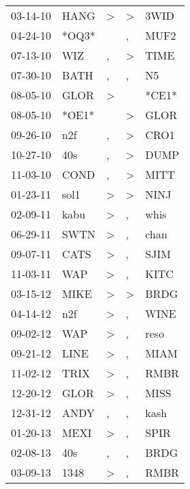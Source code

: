 \begin{supertabular}{lllll}
 03-14-10 &   HANG &     \textgreater &     \textgreater &   3WID \\
 04-24-10 &  *OQ3* &                  &                , &   MUF2 \\
 07-13-10 &    WIZ &                , &     \textgreater &   TIME \\
 07-30-10 &   BATH &                , &                , &     N5 \\
 08-05-10 &   GLOR &     \textgreater &                  &  *CE1* \\
 08-05-10 &  *OE1* &                  &     \textgreater &   GLOR \\
 09-26-10 &    n2f &                , &     \textgreater &   CRO1 \\
 10-27-10 &    40s &                , &     \textgreater &   DUMP \\
 11-03-10 &   COND &                , &     \textgreater &   MITT \\
 01-23-11 &   sol1 &     \textgreater &     \textgreater &   NINJ \\
 02-09-11 &   kabu &     \textgreater &                , &   whis \\
 06-29-11 &   SWTN &     \textgreater &                , &   chan \\
 09-07-11 &   CATS &     \textgreater &                , &   SJIM \\
 11-03-11 &    WAP &     \textgreater &                , &   KITC \\
 03-15-12 &   MIKE &     \textgreater &     \textgreater &   BRDG \\
 04-14-12 &    n2f &     \textgreater &                , &   WINE \\
 09-02-12 &    WAP &     \textgreater &                , &   reso \\
 09-21-12 &   LINE &     \textgreater &                , &   MIAM \\
 11-02-12 &   TRIX &     \textgreater &                , &   RMBR \\
 12-20-12 &   GLOR &     \textgreater &                , &   MISS \\
 12-31-12 &   ANDY &                , &                , &   kash \\
 01-20-13 &   MEXI &     \textgreater &                , &   SPIR \\
 02-08-13 &    40s &                , &                , &   BRDG \\
 03-09-13 &   1348 &     \textgreater &                , &   RMBR \\

\end{supertabular}
